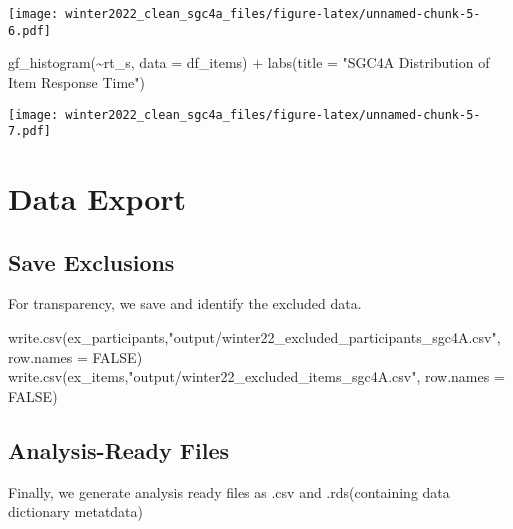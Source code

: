 \documentclass[
]{article}
\newenvironment{Shaded}{\begin{snugshade}}{\end{snugshade}}
\newcommand{\AttributeTok}[1]{\textcolor[rgb]{0.77,0.63,0.00}{#1}}
\newcommand{\ConstantTok}[1]{\textcolor[rgb]{0.00,0.00,0.00}{#1}}
\newcommand{\FunctionTok}[1]{\textcolor[rgb]{0.00,0.00,0.00}{#1}}
\newcommand{\NormalTok}[1]{#1}
\newcommand{\SpecialCharTok}[1]{\textcolor[rgb]{0.00,0.00,0.00}{#1}}
\newcommand{\StringTok}[1]{\textcolor[rgb]{0.31,0.60,0.02}{#1}}
\begin{document}
\texttt{[image: winter2022\_clean\_sgc4a\_files/figure-latex/unnamed-chunk-5-6.pdf]}

\begin{Shaded}
\begin{Highlighting}[]
\FunctionTok{gf\_histogram}\NormalTok{(}\SpecialCharTok{\textasciitilde{}}\NormalTok{rt\_s, }\AttributeTok{data =}\NormalTok{ df\_items) }\SpecialCharTok{+} 
  \FunctionTok{labs}\NormalTok{(}\AttributeTok{title =} \StringTok{"SGC4A Distribution of Item Response Time"}\NormalTok{)}
\end{Highlighting}
\end{Shaded}

\texttt{[image: winter2022\_clean\_sgc4a\_files/figure-latex/unnamed-chunk-5-7.pdf]}

\hypertarget{data-export}{%
\section{Data Export}\label{data-export}}

\hypertarget{save-exclusions}{%
\subsection{Save Exclusions}\label{save-exclusions}}

For transparency, we save and identify the excluded data.

\begin{Shaded}
\begin{Highlighting}[]
\FunctionTok{write.csv}\NormalTok{(ex\_participants,}\StringTok{"output/winter22\_excluded\_participants\_sgc4A.csv"}\NormalTok{, }\AttributeTok{row.names =} \ConstantTok{FALSE}\NormalTok{)}
\FunctionTok{write.csv}\NormalTok{(ex\_items,}\StringTok{"output/winter22\_excluded\_items\_sgc4A.csv"}\NormalTok{, }\AttributeTok{row.names =} \ConstantTok{FALSE}\NormalTok{)}
\end{Highlighting}
\end{Shaded}

\hypertarget{analysis-ready-files}{%
\subsection{Analysis-Ready Files}\label{analysis-ready-files}}

Finally, we generate analysis ready files as .csv and .rds(containing
data dictionary metatdata)
\end{document}
